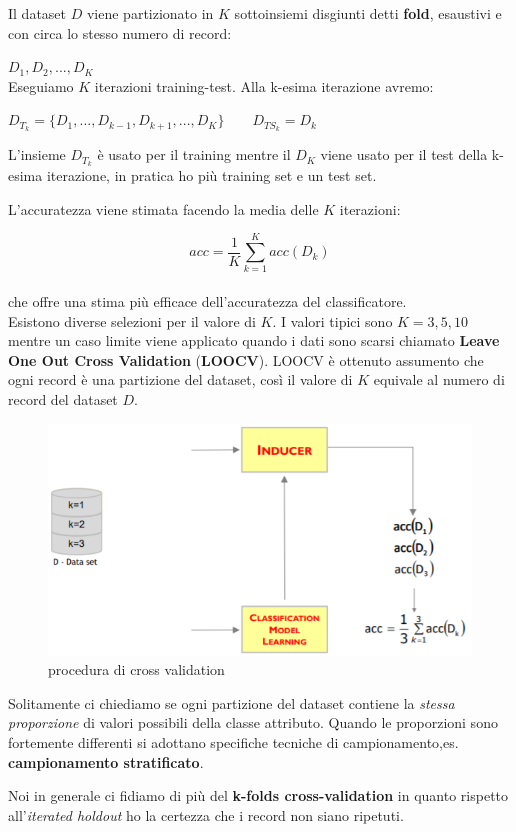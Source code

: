 Il dataset $D$ viene partizionato in $K$ sottoinsiemi disgiunti detti \textbf{fold}, esaustivi e con circa lo stesso numero di record: 

$D_1, D_2, ..., D_K$\\

Eseguiamo $K$ iterazioni training-test. Alla k-esima iterazione avremo:

$D_{T_k} = \{D_1, ...,D_{k-1},D_{k+1}, ...,D_K\} \qquad D_{TS_k} = D_k$

L'insieme $D_{T_k}$ è usato per il training  mentre il $D_K$ viene usato per il test della k-esima iterazione, in pratica ho più training set e un test set.

L'accuratezza viene stimata facendo la media delle $K$ iterazioni:

\[acc = \frac{1}{K} \sum_{k=1}^K acc(D_k)\]\\

che offre una stima più efficace dell'accuratezza del classificatore. \\

Esistono diverse selezioni per il valore di $K$. I valori tipici sono $K = 3,5,10$ mentre un caso limite viene applicato quando i dati sono scarsi chiamato \textbf{Leave One Out Cross Validation} (\textbf{LOOCV}). LOOCV è ottenuto assumento che ogni record è una partizione del dataset, così il valore di $K$ equivale al numero di record del dataset $D$.

\begin{figure}[H]
	\centering
	\includegraphics[height=0.3 \linewidth]{classification/pict/cross_validation.png}
	\caption{procedura di cross validation}
\end{figure}

Solitamente ci chiediamo se ogni partizione del dataset contiene la \textit{stessa proporzione} di valori possibili della classe attributo. Quando le proporzioni sono fortemente differenti si adottano specifiche tecniche di campionamento,es. \textbf{campionamento stratificato}. 

Noi in generale ci fidiamo di pi\`u del \textbf{k-folds cross-validation} in quanto rispetto all'\textit{iterated holdout} ho la certezza che i record non siano ripetuti.

